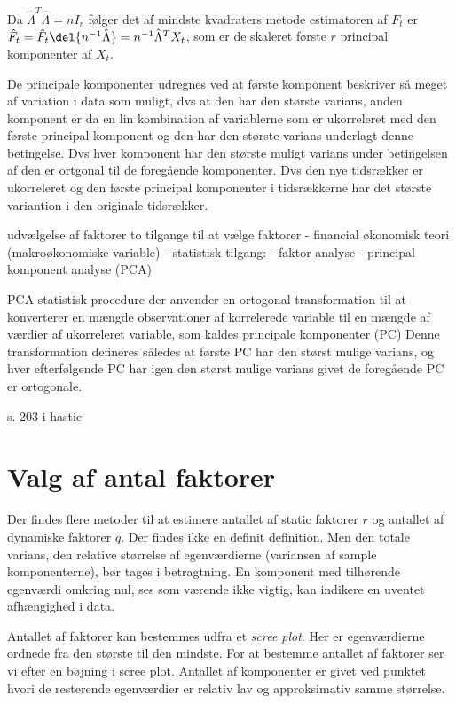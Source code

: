 Da $\hat{\Lambda}^T \hat{\Lambda}=nI_r$ følger det af mindste kvadraters metode estimatoren af $F_t$ er $\hat{F}_t=\hat{F}_t \del{n^{-1}\hat{\Lambda}}=n^{-1}\hat{\Lambda}^TX_t$, som er de skaleret første $r$ principal komponenter af $X_t$.

De principale komponenter udregnes ved at første komponent beskriver så meget af variation i data som muligt, dvs at den har den største varians, anden komponent er da en lin kombination af variablerne som er ukorreleret med den første principal komponent og den har den største varians underlagt denne betingelse.
Dvs hver komponent har den største muligt varians under betingelsen af den er ortgonal til de foregående komponenter.
Dvs den nye tidsrækker er ukorreleret og den første principal komponenter i tidsrækkerne har det største variantion i den originale tidsrækker.


udvælgelse af faktorer
to tilgange til at vælge faktorer
- financial økonomisk teori (makroøkonomiske variable)
- statistisk tilgang: 
- faktor analyse
- principal komponent analyse (PCA)

PCA
statistisk procedure der anvender en ortogonal transformation til at konverterer en mængde observationer af korrelerede variable til en mængde af værdier af ukorreleret variable, som kaldes principale komponenter (PC)
Denne transformation defineres således at første PC har den størst mulige varians, og hver efterfølgende PC har igen den størst mulige varians givet de foregående PC er ortogonale.


s. 203 i hastie

\section{Valg af antal faktorer}
Der findes flere metoder til at estimere antallet af static faktorer $r$ og antallet af dynamiske faktorer $q$.
Der findes ikke en definit definition.
Men den totale varians, den relative størrelse af egenværdierne (variansen af sample komponenterne), bør tages i betragtning.
En komponent med tilhørende egenværdi omkring nul, ses som værende ikke vigtig, kan indikere en uventet afhængighed i data.





Antallet af faktorer kan bestemmes udfra et \textit{scree plot}.
Her er egenværdierne ordnede fra den største til den mindste.
For at bestemme antallet af faktorer ser vi efter en bøjning i scree plot.
Antallet af komponenter er givet ved punktet hvori de resterende egenværdier er relativ lav og approksimativ samme størrelse.



